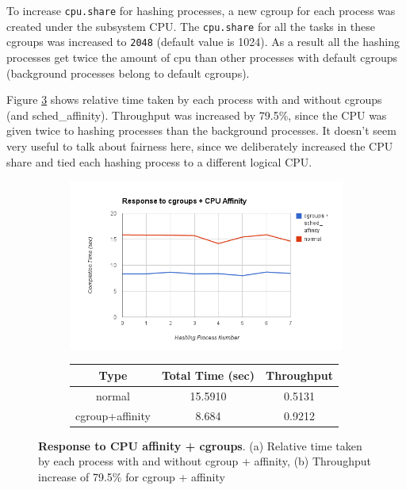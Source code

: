 \documentclass[10pt] {article}
\begin{document}
\noindent To increase \texttt{cpu.share} for hashing processes, a new cgroup for each process was created under the subsystem CPU. The \texttt{cpu.share} for all the tasks in these cgroups was increased to \texttt{2048} (default value is 1024). As a result all the hashing processes get twice the amount of cpu than other processes with default cgroups (background processes belong to default cgroups).

Figure \ref{fig:cgrp} shows relative time taken by each process with and without cgroups (and sched\_affinity). Throughput  was increased by 79.5\%, since the CPU was given twice to hashing processes than the background processes. It doesn't seem very useful to talk about fairness here, since we deliberately increased the CPU share and tied each hashing process to a different logical CPU.

\begin{figure}[ht!]
\centering
\begin{subfigure}{.5\textwidth}
  \centering
  \includegraphics[width=\linewidth]{cgroup_affinity_8_9.png}
  \caption{}
  \label{fig:sub1}
\end{subfigure}%
\begin{subfigure}{.5\textwidth}
\centering

\begin{tabular}{ |c|c|c| } 
\hline
\textbf{Type} & \textbf{Total Time (sec)} & \textbf{Throughput} \\
\hline
normal & 15.5910 & 0.5131\\ 
\hline
cgroup+affinity &  8.684 & 0.9212 \\
\hline
\end{tabular}
\caption{}
\label{table:nvsnplusone}
  \label{fig:sub2}
\end{subfigure}
\caption{\textbf{Response to CPU affinity + cgroups}. (a) Relative time taken by each process with and without cgroup + affinity, (b) Throughput increase of 79.5\% for cgroup + affinity}
\label{fig:cgrp}
\end{figure}
\end{document}
